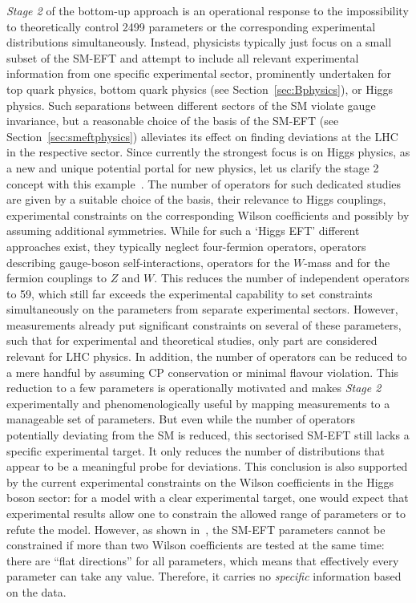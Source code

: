 \emph{Stage 2} of the bottom-up approach is an operational response
to the impossibility to theoretically control 2499 parameters or the corresponding experimental distributions simultaneously. 
Instead, physicists typically just focus on a small subset of the SM-EFT and attempt to include all relevant experimental information from one specific experimental sector, prominently undertaken for top quark physics, bottom quark physics (see Section~\ref{sec:Bphysics}), or Higgs physics. 
Such separations between different sectors of the SM
violate gauge invariance, but a reasonable choice of the basis of the
SM-EFT (see Section~\ref{sec:smeftphysics}) alleviates its effect on  
finding deviations at the LHC in the respective sector.
Since currently the strongest focus is on Higgs physics, as a new
and unique potential portal for new physics, let us clarify the stage 2 concept with
this example~\citep{Espinosa:2016ovf,deFlorian:2016spz}.
The number of operators for such dedicated studies are given by a suitable choice
of the basis, their relevance to Higgs couplings,
experimental constraints on the corresponding Wilson coefficients and
possibly by assuming additional symmetries.
While for such a `Higgs EFT' different approaches exist, they typically neglect
four-fermion operators, operators
describing gauge-boson self-interactions, operators for the $W$-mass and 
for the fermion couplings to $Z$ and $W$.
This reduces the number of independent operators to 59, which still far exceeds the experimental capability to set constraints simultaneously on the parameters from separate experimental sectors. 
However, measurements already put significant constraints on several of these parameters, such that for experimental and theoretical studies, only part are considered relevant for LHC physics.
In addition, the number of operators can be reduced to a mere handful by assuming CP conservation or minimal flavour violation.
This reduction to a few parameters is operationally motivated and makes \emph{Stage 2} experimentally and phenomenologically useful by mapping measurements to a manageable set of parameters. 
But even while the number of operators potentially deviating from the SM is reduced, this sectorised SM-EFT still lacks a specific experimental target. 
It only reduces the number of distributions that appear to be a meaningful probe for deviations.
This conclusion is also supported by the current experimental constraints on the Wilson coefficients in the Higgs boson sector: for a model with a clear experimental target, one would expect that experimental results allow one to constrain the allowed range of parameters or to refute the
model. 
However, as shown in~\citep{ATL-PHYS-PUB-2019-042},
the SM-EFT parameters cannot be constrained if more than two Wilson
coefficients are tested at the same time: there are ``flat
directions'' for all parameters, which means that effectively every
parameter can take any value. Therefore, it carries no
\emph{specific} information based on the data.

